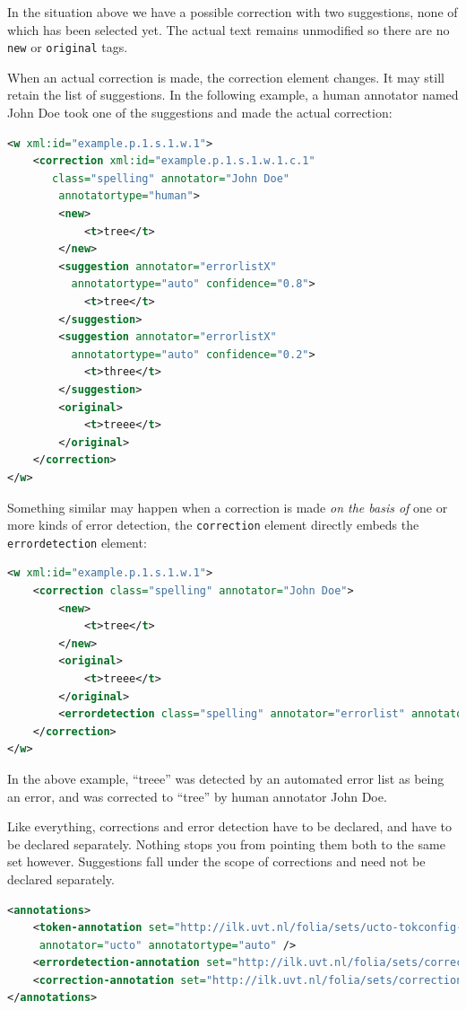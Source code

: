 \documentclass[a4paper,12pt]{report}
\begin{document}
In the situation above we have a possible correction with two suggestions, none of which has been selected yet. The actual text remains unmodified so there are no \texttt{new} or \texttt{original} tags.

When an actual correction is made, the correction element changes. It may still retain the list of suggestions. In the following example, a human annotator named John Doe took one of the suggestions and made the actual correction:

\begin{lstlisting}[language=xml]
<w xml:id="example.p.1.s.1.w.1">
    <correction xml:id="example.p.1.s.1.w.1.c.1"
       class="spelling" annotator="John Doe"
        annotatortype="human">
        <new>
            <t>tree</t>
        </new>
        <suggestion annotator="errorlistX" 
          annotatortype="auto" confidence="0.8">
            <t>tree</t>
        </suggestion>
        <suggestion annotator="errorlistX" 
          annotatortype="auto" confidence="0.2">
            <t>three</t>
        </suggestion>
        <original>
            <t>treee</t>
        </original>
    </correction>
</w>    
\end{lstlisting}

Something similar may happen when a correction is made \emph{on the basis of} one or more kinds of error detection, the \texttt{correction} element directly embeds the \texttt{errordetection} element:

\begin{lstlisting}[language=xml]
<w xml:id="example.p.1.s.1.w.1">
    <correction class="spelling" annotator="John Doe">
        <new>
            <t>tree</t>
        </new>
        <original>
            <t>treee</t>
        </original>
        <errordetection class="spelling" annotator="errorlist" annotatortype="auto" error="yes" />
    </correction>
</w>
\end{lstlisting}

In the above example, ``treee'' was detected by an automated error list as being an error, and was corrected to ``tree'' by human annotator John Doe.

Like everything, corrections and error detection have to be declared, and have to be declared separately. Nothing stops you from pointing them both to the same set however. Suggestions fall under the scope of corrections and need not be declared separately.

\begin{lstlisting}[language=xml]
<annotations>
    <token-annotation set="http://ilk.uvt.nl/folia/sets/ucto-tokconfig-nl" 
     annotator="ucto" annotatortype="auto" />
    <errordetection-annotation set="http://ilk.uvt.nl/folia/sets/corrections" />
    <correction-annotation set="http://ilk.uvt.nl/folia/sets/corrections" />
</annotations>
\end{lstlisting}
\end{document}
